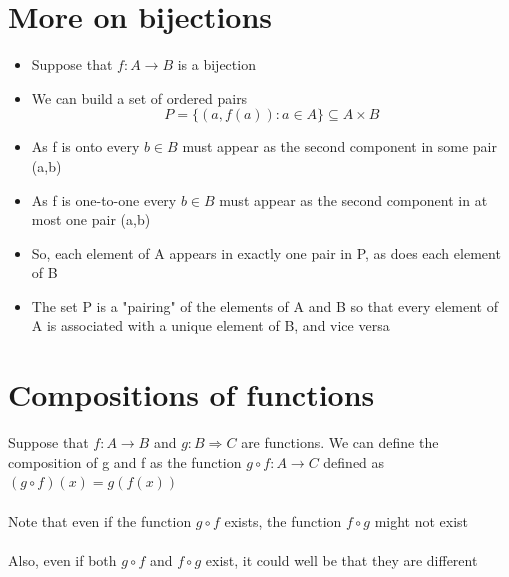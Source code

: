 \documentclass{article}[18pt]
\begin{document}
\section{More on bijections}
\begin{itemize}
	\item Suppose that $f: A\rightarrow B$ is a bijection
	\item We can build a set of ordered pairs
	$$P = \{ ( a , f ( a ) ) : a \in A \} \subseteq A \times B$$
	\item As f is onto every $b\in B$ must appear as the second component in some pair (a,b)
	\item As f is one-to-one every $b\in B$ must appear as the second component in at most one pair (a,b)
	\item So, each element of A appears in exactly one pair in P, as does each element of B
	\item The set P is a "pairing" of the elements of A and B so that every element of A is associated with a unique element of B, and vice versa
\end{itemize}
\section{Compositions of functions}
Suppose that $f: A\rightarrow B$ and $g: B\Rightarrow C$ are functions. We can define the composition of g and f as the function $g \circ f : A \rightarrow C$ defined as $( g \circ f ) ( x ) = g ( f ( x ) )$\\
\\
Note that even if the function $g\circ f$ exists, the function $f\circ g$ might not exist\\
\\
Also, even if both $g\circ f$ and $f\circ g$ exist, it could well be that they are different
\end{document}
